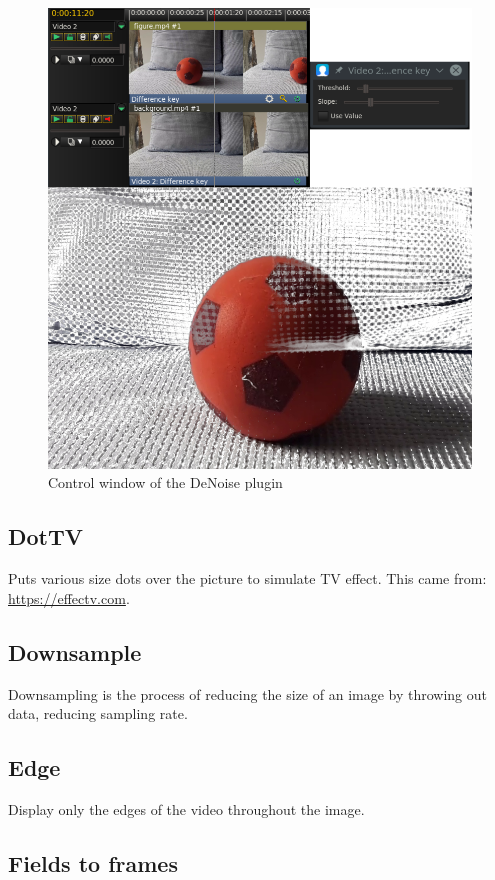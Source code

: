 \begin{figure}[htpb]
    \centering
    \includegraphics[width=0.8\linewidth]{images/diff-key.png}
    \caption{Control window of the DeNoise plugin}
    \label{fig:diff-key}
\end{figure}

\subsection{DotTV}%
\label{sub:dottv}

Puts various size dots over the picture to simulate TV effect. This came from: \url{https://effectv.com}.

\subsection{Downsample}%
\label{sub:downsample}

Downsampling is the process of reducing the size of an image by throwing out data, reducing sampling rate.

\subsection{Edge}%
\label{sub:edge}

Display only the edges of the video throughout the image.

\subsection{Fields to frames}%
\label{sub:fields_to_frames}

